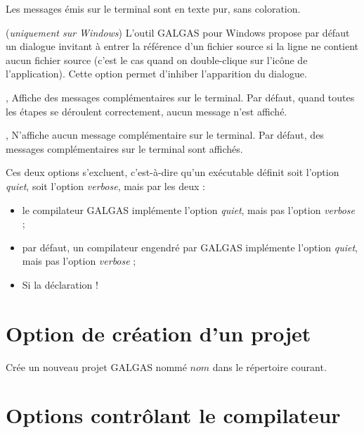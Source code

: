  Les messages émis sur le terminal sont en texte pur, sans coloration.

 (\emph{uniquement sur Windows}) L’outil GALGAS pour Windows propose par défaut un dialogue invitant à entrer la référence d’un fichier source si la ligne ne contient aucun fichier source (c’est le cas quand on double-clique sur l’icône de l’application). Cette option permet d'inhiber l’apparition du dialogue.




,  Affiche des messages complémentaires sur le terminal. Par défaut, quand toutes les étapes se déroulent correctement, aucun message n’est affiché.

,  N'affiche aucun message complémentaire sur le terminal. Par défaut, des messages complémentaires sur le terminal sont affichés.

Ces deux options s'excluent, c'est-à-dire qu'un exécutable définit soit l'option \emph{quiet}, soit l'option \emph{verbose}, mais par les deux :
\begin{itemize}
  \item le compilateur GALGAS implémente l'option \emph{quiet}, mais pas l'option \emph{verbose} ;
  \item par défaut, un compilateur engendré par GALGAS implémente l'option \emph{quiet}, mais pas l'option \emph{verbose} ;
  \item Si la déclaration \ggs!%
\end{itemize}





\section{Option de création d'un projet}


 Crée un nouveau projet GALGAS nommé $nom$ dans le répertoire courant.




\section{Options contrôlant le compilateur}





